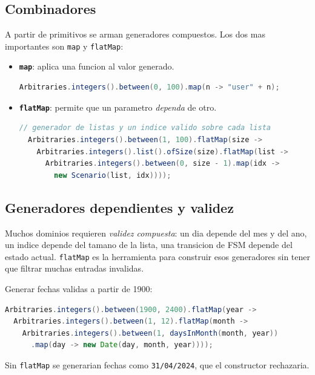 \documentclass[12pt,a4paper]{article}
\begin{document}
\subsection{Combinadores}

A partir de primitivos se arman generadores compuestos. Los dos mas importantes son
\texttt{map} y \texttt{flatMap}:

\begin{itemize}
  \item \textbf{\texttt{map}}: aplica una funcion al valor generado.
  \begin{lstlisting}[style=codestyle,language=Java]
  Arbitraries.integers().between(0, 100).map(n -> "user" + n);
  \end{lstlisting}
  \item \textbf{\texttt{flatMap}}: permite que un parametro \emph{dependa} de otro.
  \begin{lstlisting}[style=codestyle,language=Java]
  // generador de listas y un indice valido sobre cada lista
  Arbitraries.integers().between(1, 100).flatMap(size ->
    Arbitraries.integers().list().ofSize(size).flatMap(list ->
      Arbitraries.integers().between(0, size - 1).map(idx ->
        new Scenario(list, idx))));
  \end{lstlisting}
\end{itemize}

\subsection{Generadores dependientes y validez}

Muchos dominios requieren \emph{validez compuesta}: un dia depende del mes y del ano, un
indice depende del tamano de la lista, una transicion de FSM depende del estado actual.
\texttt{flatMap} es la herramienta para construir esos generadores sin tener que filtrar
muchas entradas invalidas.

\begin{ejemplobox}
Generar fechas validas a partir de 1900:
\begin{lstlisting}[style=codestyle,language=Java]
Arbitraries.integers().between(1900, 2400).flatMap(year ->
  Arbitraries.integers().between(1, 12).flatMap(month ->
    Arbitraries.integers().between(1, daysInMonth(month, year))
      .map(day -> new Date(day, month, year))));
\end{lstlisting}
Sin \texttt{flatMap} se generarian fechas como \texttt{31/04/2024}, que el constructor
rechazaria.
\end{ejemplobox}
\end{document}
